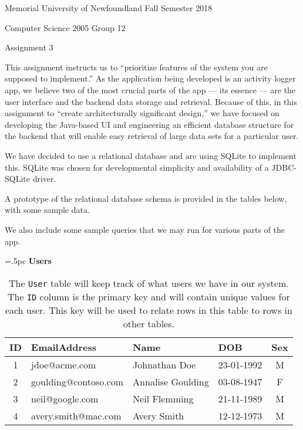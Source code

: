 \documentclass{article}
\theoremstyle{definition}
\begin{document}
{\bf\parindent=0pt

	Memorial University of Newfoundland \hfill Fall Semester 2018 
	
	Computer Science 2005 \hfill Group 12

}

\vskip 2pc

{\bfbig

	\hfill Assignment 3 \hfill
}

\vskip 1pc

This assignment instructs us to ``prioritize features of the system you are supposed to implement.'' As the application being developed is an activity logger app, we believe two of the most crucial parts of the app --- its essence --- are the user interface and the backend data storage and retrieval. Because of this, in this assignment to ``create architecturally significant design,'' we have focused on developing the Java-based UI and engineering an efficient database structure for the backend that will enable easy retrieval of large data sets for a particular user. 

We have decided to use a relational database and are using SQLite to implement this. SQLite was chosen for developmental simplicity and availability of a JDBC-SQLite driver.

A prototype of the relational database schema is provided in the tables below, with some sample data.

We also include some sample queries that we may run for various parts of the app.

\begin{table}[H]
	\centering
	\tabcolsep=.5pc
	{\bf Users}
	
	\begin{tabular}{clllc} \hline 
		ID & EmailAddress & Name & DOB & Sex \\ \hline  
		1 & jdoe@acme.com & Johnathan Doe & 23-01-1992 & M \\
		2 & goulding@contoso.com & Annalise Goulding & 03-08-1947 & F \\
		3 & neil@google.com & Neil Flemming & 21-11-1989 & M \\
		4 & avery.smith@mac.com & Avery Smith & 12-12-1973 & M \\
		\hline 
	\end{tabular}
	\caption{\label{tab:users}
		The {\tt User} table will keep track of what users we have in our system. The {\tt ID} column is the primary key and will contain unique values for each user. This key will be used to relate rows in this table to rows in other tables.	
	}
\end{table}
\end{document}
